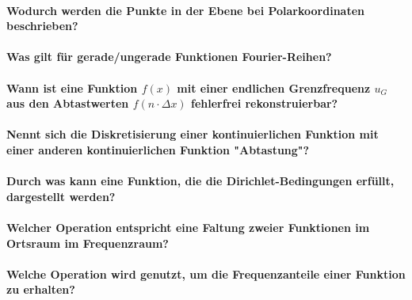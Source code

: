 		\paragraph{Wodurch werden die Punkte in der Ebene bei Polarkoordinaten beschrieben?}

		\paragraph{Was gilt für gerade/ungerade Funktionen \bzgl Fourier-Reihen?}

		\paragraph{Wann ist eine Funktion \(f(x)\) mit einer endlichen Grenzfrequenz \(u_G\) aus den Abtastwerten \(f(n \cdot \Delta x)\) fehlerfrei rekonstruierbar?}

		\paragraph{Nennt sich die Diskretisierung einer kontinuierlichen Funktion mit einer anderen kontinuierlichen Funktion "Abtastung"?}

		\paragraph{Durch was kann eine Funktion, die die Dirichlet-Bedingungen erfüllt, dargestellt werden?}

		\paragraph{Welcher Operation entspricht eine Faltung zweier Funktionen im Ortsraum im Frequenzraum?}

		\paragraph{Welche Operation wird genutzt, um die Frequenzanteile einer Funktion zu erhalten?}

